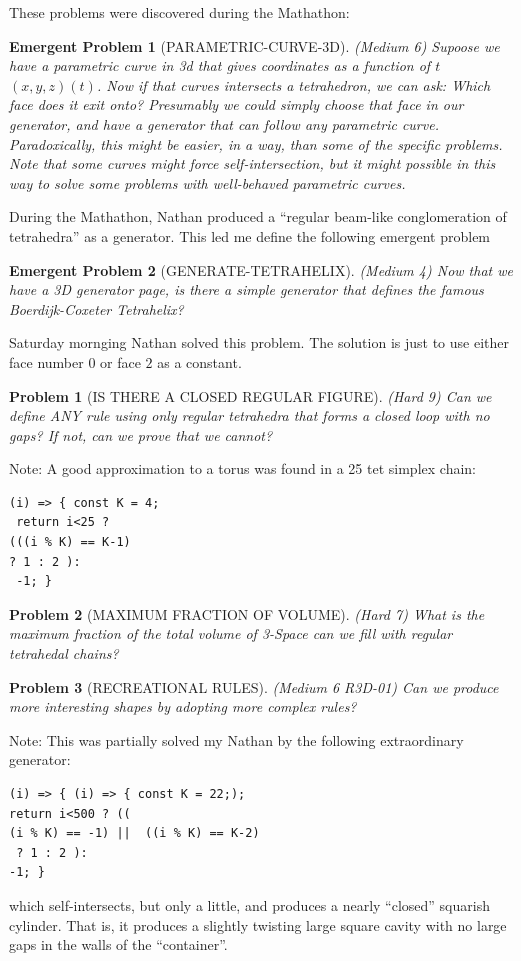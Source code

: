 \documentclass[11pt]{article}
\newtheorem{problem}{Problem}
\newtheorem{eproblem}{Emergent Problem}
\begin{document}
These problems were discovered during the Mathathon:
\begin{eproblem}[PARAMETRIC-CURVE-3D] (Medium 6)
  Supoose we have a parametric curve in 3d that gives coordinates as a function of $t$ $(x,y,z)(t)$.
  Now if that curves intersects a tetrahedron, we can ask: Which face does it exit onto? Presumably we could
  simply choose that face in our generator, and have a generator that can follow any parametric curve.
  Paradoxically, this might be easier, in a way, than some of the specific problems. Note that some curves
  might force self-intersection, but it might possible in this way to solve some problems with well-behaved
  parametric curves.
\end{eproblem}
During the Mathathon, Nathan produced a ``regular beam-like conglomeration of tetrahedra'' as a generator. This
led me define the following emergent problem
\begin{eproblem}[GENERATE-TETRAHELIX]
(Medium 4)  Now that we have a 3D generator page, is there a simple generator that defines the famous Boerdijk-Coxeter Tetrahelix?
\end{eproblem}

Saturday mornging Nathan solved this problem. The solution is just to use either face number $0$ or face $2$ as a constant.

\begin{problem}[IS THERE A CLOSED REGULAR FIGURE]
(Hard 9) Can we define ANY rule using only regular tetrahedra that forms a closed loop with no gaps? If not, can we prove that we cannot?  
\end{problem}

Note: A good approximation to a torus was found in a 25 tet simplex chain:
\begin{verbatim}
(i) => { const K = 4;
 return i<25 ? 
(((i % K) == K-1) 
? 1 : 2 ):
 -1; }
\end{verbatim}


\begin{problem}[MAXIMUM FRACTION OF VOLUME]
(Hard 7) What is the maximum fraction of the total volume of 3-Space can we fill with regular tetrahedal chains?
\end{problem}

\begin{problem}[RECREATIONAL RULES]
(Medium 6 R3D-01) Can we produce more interesting shapes by adopting more complex rules?  
\end{problem}

Note: This was partially solved my Nathan by the following extraordinary generator:
\begin{verbatim}
(i) => { (i) => { const K = 22;);
return i<500 ? ((
(i % K) == -1) ||  ((i % K) == K-2) 
 ? 1 : 2 ): 
-1; }
\end{verbatim}
which self-intersects, but only a little, and produces a nearly ``closed'' squarish cylinder. That is, it produces a slightly twisting large square
cavity with no large gaps in the walls of the ``container''.
\end{document}
